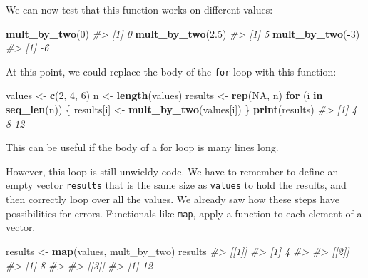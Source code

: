 \documentclass[]{book}
\newenvironment{Shaded}{\begin{snugshade}}{\end{snugshade}}
\newcommand{\KeywordTok}[1]{\textcolor[rgb]{0.13,0.29,0.53}{\textbf{#1}}}
\newcommand{\DecValTok}[1]{\textcolor[rgb]{0.00,0.00,0.81}{#1}}
\newcommand{\FloatTok}[1]{\textcolor[rgb]{0.00,0.00,0.81}{#1}}
\newcommand{\StringTok}[1]{\textcolor[rgb]{0.31,0.60,0.02}{#1}}
\newcommand{\CommentTok}[1]{\textcolor[rgb]{0.56,0.35,0.01}{\textit{#1}}}
\newcommand{\OtherTok}[1]{\textcolor[rgb]{0.56,0.35,0.01}{#1}}
\newcommand{\ControlFlowTok}[1]{\textcolor[rgb]{0.13,0.29,0.53}{\textbf{#1}}}
\newcommand{\OperatorTok}[1]{\textcolor[rgb]{0.81,0.36,0.00}{\textbf{#1}}}
\newcommand{\NormalTok}[1]{#1}
\theoremstyle{definition}
\theoremstyle{definition}
\theoremstyle{definition}
\theoremstyle{remark}
\begin{document}
We can now test that this function works on different values:

\begin{Shaded}
\begin{Highlighting}[]
\KeywordTok{mult_by_two}\NormalTok{(}\DecValTok{0}\NormalTok{)}
\CommentTok{#> [1] 0}
\KeywordTok{mult_by_two}\NormalTok{(}\FloatTok{2.5}\NormalTok{)}
\CommentTok{#> [1] 5}
\KeywordTok{mult_by_two}\NormalTok{(}\OperatorTok{-}\DecValTok{3}\NormalTok{)}
\CommentTok{#> [1] -6}
\end{Highlighting}
\end{Shaded}

At this point, we could replace the body of the \texttt{for} loop with
this function:

\begin{Shaded}
\begin{Highlighting}[]
\NormalTok{values <-}\StringTok{ }\KeywordTok{c}\NormalTok{(}\DecValTok{2}\NormalTok{, }\DecValTok{4}\NormalTok{, }\DecValTok{6}\NormalTok{)}
\NormalTok{n <-}\StringTok{ }\KeywordTok{length}\NormalTok{(values)}
\NormalTok{results <-}\StringTok{ }\KeywordTok{rep}\NormalTok{(}\OtherTok{NA}\NormalTok{, n)}
\ControlFlowTok{for}\NormalTok{ (i }\ControlFlowTok{in} \KeywordTok{seq_len}\NormalTok{(n)) \{}
\NormalTok{  results[i] <-}\StringTok{ }\KeywordTok{mult_by_two}\NormalTok{(values[i])}
\NormalTok{\}}
\KeywordTok{print}\NormalTok{(results)}
\CommentTok{#> [1]  4  8 12}
\end{Highlighting}
\end{Shaded}

This can be useful if the body of a for loop is many lines long.

However, this loop is still unwieldy code. We have to remember to define
an empty vector \texttt{results} that is the same size as
\texttt{values} to hold the results, and then correctly loop over all
the values. We already saw how these steps have possibilities for
errors. Functionals like \texttt{map}, apply a function to each element
of a vector.

\begin{Shaded}
\begin{Highlighting}[]
\NormalTok{results <-}\StringTok{ }\KeywordTok{map}\NormalTok{(values, mult_by_two)}
\NormalTok{results}
\CommentTok{#> [[1]]}
\CommentTok{#> [1] 4}
\CommentTok{#> }
\CommentTok{#> [[2]]}
\CommentTok{#> [1] 8}
\CommentTok{#> }
\CommentTok{#> [[3]]}
\CommentTok{#> [1] 12}
\end{Highlighting}
\end{Shaded}
\end{document}
